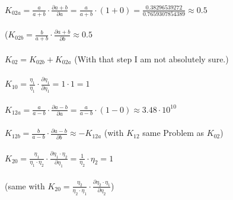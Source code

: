 \documentclass[11pt,a4paper,notitlepage,onecolumn]{article}
\begin{document}
\paragraph{}
$K_{02a}=\frac{a}{a+b}\cdot\frac{\partial a+b}{\partial a}
=\frac{a}{a+b}\cdot(1+0)
=\frac{0.38296539272}{0.7659307854389}
\approx 0.5
$

\paragraph{}
($K_{02b}=\frac{b}{a+b}\cdot\frac{\partial a+b}{\partial b}
\approx 0.5$ 

\paragraph{}
$K_{02}=K_{02b}+K_{02a}$ (With that step I am not absolutely sure.)

\paragraph{}
$K_{10}=\frac{\eta_1}{\eta_1}\cdot\frac{\partial \eta_1}{\partial \eta_1}
=1\cdot1
=1$

\paragraph{}
$K_{12a}=\frac{a}{a-b}\cdot\frac{\partial a-b}{\partial a}
=\frac{a}{a-b}\cdot(1-0)
\approx 3.48 \cdot 10^{10}
$

\paragraph{}
$K_{12b}=\frac{b}{a-b}\cdot\frac{\partial a-b}{\partial b}
\approx - K_{12a}$ (with $K_{12}$ same Problem as $K_{02}$)


\paragraph{}
$K_{20}=\frac{\eta_1}{\eta_1\cdot\eta_2}
\cdot\frac{\partial \eta_1\cdot\eta_2}{\partial \eta_1}
=\frac{1}{\eta_2}\cdot\eta_2=1$

\paragraph{}
(same with 
$K_{20}=\frac{\eta_2}{\eta_2\cdot\eta_1}
\cdot\frac{\partial \eta_2\cdot\eta_1}{\partial \eta_2}
$)
\end{document}
